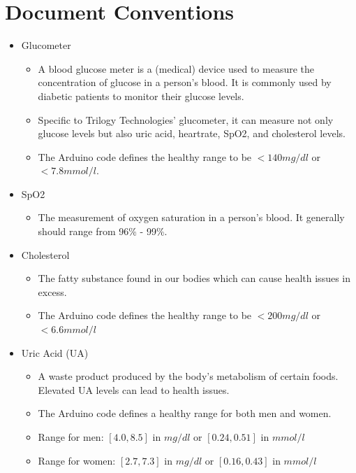 \documentclass[a4paper]{scrreprt}
\begin{document}
\section{Document Conventions}\begin{itemize}
    \item Glucometer
    \begin{itemize}
        \item A blood glucose meter is a (medical) device used to measure the concentration of glucose in a person’s blood. It is commonly used by diabetic patients to monitor their glucose levels.
        \item Specific to Trilogy Technologies’ glucometer, it can measure not only glucose levels but also uric acid, heartrate, SpO2, and cholesterol levels.
        \item The Arduino code defines the healthy range to be $<140mg/dl$ or $<7.8mmol/l$.
    \end{itemize}
    
    \item SpO2
    \begin{itemize}
        \item The measurement of oxygen saturation in a person’s blood. It generally should range from 96\% - 99\%.
    \end{itemize}

    \item Cholesterol
    \begin{itemize}
        \item The fatty substance found in our bodies which can cause health issues in excess.
        \item The Arduino code defines the healthy range to be $<200mg/dl$ or $<6.6mmol/l$
    \end{itemize}

    \item Uric Acid (UA)
    \begin{itemize}
        \item A waste product produced by the body's metabolism of certain foods. Elevated UA levels can lead to health issues.
        \item The Arduino code defines a healthy range for both men and women.
        \item Range for men: $[4.0, 8.5]$ in $mg/dl$ or $[0.24, 0.51]$ in $mmol/l$
        \item Range for women: $[2.7, 7.3]$ in $mg/dl$ or $[0.16, 0.43]$ in $mmol/l$
    \end{itemize}


\end{itemize}
\end{document}
